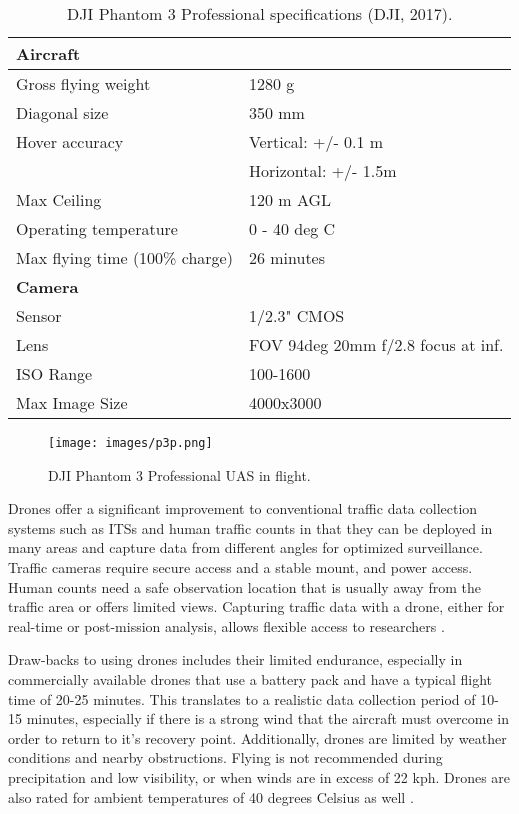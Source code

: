 \documentclass[preprint,12pt,a4paper,authoryear]{elsarticle}
\begin{document}
\begin{linenumbers}
\begin{enumerate}
\end{enumerate}

\begin{table}[H]
\centering
\caption{DJI Phantom 3 Professional specifications (DJI, 2017).}
\label{tb:p3p-specs}
\begin{tabular}{@{}ll@{}}
\hline
\textbf{Aircraft} &  \\ \hline
Gross flying weight & 1280 g \\
Diagonal size & 350 mm \\
Hover accuracy & Vertical: +/- 0.1 m \\
 & Horizontal: +/- 1.5m \\
Max Ceiling & 120 m AGL \\
Operating temperature & 0 - 40 deg C \\
Max flying time (100\% charge) & 26 minutes \\ \hline
\textbf{Camera} &  \\ \hline
Sensor & 1/2.3" CMOS \\
Lens & FOV 94deg 20mm f/2.8 focus at inf. \\
ISO Range & 100-1600 \\
Max Image Size & 4000x3000 \\ \hline
\end{tabular}
\end{table}

%
\begin{figure}
\centering
\texttt{[image: images/p3p.png]}  %
\caption{DJI Phantom 3 Professional UAS in flight.}
\label{fig:p3p}
\end{figure}
%
Drones offer a significant improvement to conventional traffic data collection systems such as ITSs and human traffic counts in that they can be deployed in many areas and capture data from different angles for optimized surveillance. Traffic cameras require secure access and a stable mount, and power access. Human counts need a safe observation location that is usually away from the traffic area or offers limited views. Capturing traffic data with a drone, either for real-time or post-mission analysis, allows flexible access to researchers \citep{Westoby2012}. 

Draw-backs to using drones includes their limited endurance, especially in commercially available drones that use a battery pack and have a typical flight time of 20-25 minutes. This translates to a realistic data collection period of 10-15 minutes, especially if there is a strong wind that the aircraft must overcome in order to return to it's recovery point. Additionally, drones are limited by weather conditions and nearby obstructions. Flying is not recommended during precipitation and low visibility, or when winds are in excess of 22 kph. Drones are also rated for ambient temperatures of 40 degrees Celsius as well \citep{DJI2017}.


\end{linenumbers}
\end{document}

